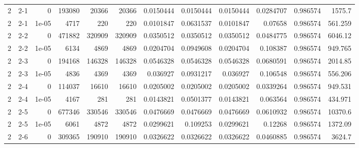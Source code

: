 \begin{tabular}{rlrrrrrrrrrr}
     2 & 2-1    &      0     &      193080 &             20366 &             20366 &     0.0150444   &     0.0150444   &      0.0150444   &        0.0284707 &               0.986574 &         1575.7     \\
     2 & 2-1    &      1e-05 &        4717 &               220 &               220 &     0.0101847   &     0.0631537   &      0.0101847   &        0.07658   &               0.986574 &          561.259   \\
     2 & 2-2    &      0     &      471882 &            320909 &            320909 &     0.0350512   &     0.0350512   &      0.0350512   &        0.0484775 &               0.986574 &         6046.12    \\
     2 & 2-2    &      1e-05 &        6134 &              4869 &              4869 &     0.0204704   &     0.0949608   &      0.0204704   &        0.108387  &               0.986574 &          949.765   \\
     2 & 2-3    &      0     &      194168 &            146328 &            146328 &     0.0546328   &     0.0546328   &      0.0546328   &        0.0680591 &               0.986574 &         2014.85    \\
     2 & 2-3    &      1e-05 &        4836 &              4369 &              4369 &     0.036927    &     0.0931217   &      0.036927    &        0.106548  &               0.986574 &          556.206   \\
     2 & 2-4    &      0     &      114037 &             16610 &             16610 &     0.0205002   &     0.0205002   &      0.0205002   &        0.0339264 &               0.986574 &          949.531   \\
     2 & 2-4    &      1e-05 &        4167 &               281 &               281 &     0.0143821   &     0.0501377   &      0.0143821   &        0.063564  &               0.986574 &          434.971   \\
     2 & 2-5    &      0     &      677346 &            330546 &            330546 &     0.0476669   &     0.0476669   &      0.0476669   &        0.0610932 &               0.986574 &        10370.6     \\
     2 & 2-5    &      1e-05 &        6061 &              4872 &              4872 &     0.0299621   &     0.109253    &      0.0299621   &        0.12268   &               0.986574 &         1372.09    \\
     2 & 2-6    &      0     &      309365 &            190910 &            190910 &     0.0326622   &     0.0326622   &      0.0326622   &        0.0460885 &               0.986574 &         3624.7     \\

\end{tabular}
